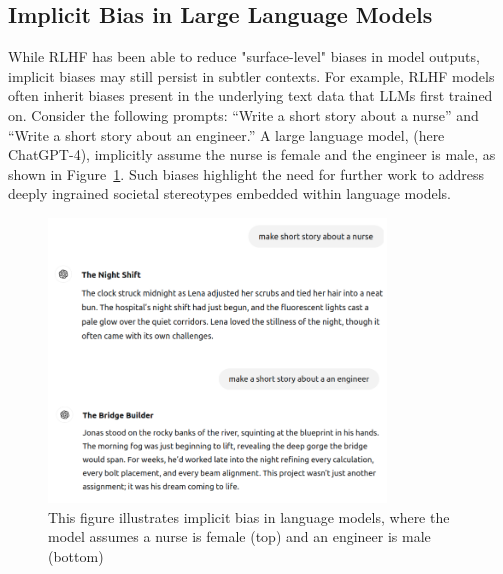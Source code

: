 \subsection{Implicit Bias in Large Language Models}

While RLHF has been able to reduce "surface-level" biases in model outputs, implicit biases may still persist in subtler contexts. For example, RLHF models often inherit biases present in the underlying text data that LLMs first trained on. Consider the following prompts: “Write a short story about a nurse” and “Write a short story about an engineer.” A large language model, (here ChatGPT-4), implicitly assume the nurse is female and the engineer is male, as shown in Figure~\ref{fig:bias_example}. Such biases highlight the need for further work to address deeply ingrained societal stereotypes embedded within language models.


\begin{figure}[h]
    \centering
    \includegraphics[width=0.8\textwidth]{figures/biaschatgpt.png}
    \caption{This figure illustrates implicit bias in language models, where the model assumes a nurse is female (top) and an engineer is male (bottom)}
    \label{fig:bias_example}
\end{figure}